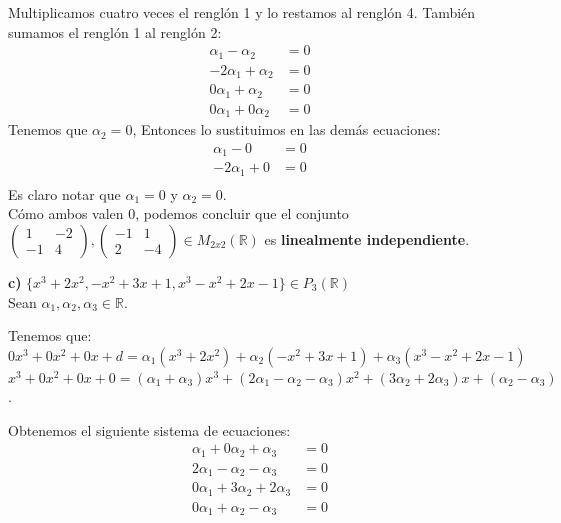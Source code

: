 \documentclass[letterpaper]{article}
\renewcommand{\*}{\cdot}
\theoremstyle{definition}
\begin{document}
Multiplicamos cuatro veces el renglón 1 y lo restamos al renglón 4. También sumamos el renglón 1 al renglón 2:
	\begin{align*}
	\alpha_{1}-\alpha_{2} &= 0\\
	-2\alpha_{1} + \alpha_{2} &= 0\\
	0\alpha_{1}+\alpha_{2}&= 0\\
	0\alpha_{1}+0\alpha_{2}&= 0
	\end{align*}
Tenemos que $\alpha_{2}= 0$, Entonces lo sustituimos en las demás ecuaciones:
	\begin{align*}
	\alpha_{1}-0 &= 0\\
	-2\alpha_{1} + 0 &= 0\\
	\end{align*}
Es claro notar que $\alpha_{1}=0$ y $\alpha_{2}=0$.\\ Cómo ambos valen 0, podemos concluir que el conjunto $\begin{pmatrix} 1 & -2 \\ -1 & 4 \end{pmatrix} ,\begin{pmatrix} -1 & 1 \\ 2 & -4 \end{pmatrix}\in M_{2x2}(\mathbb{R})$ es \textbf{linealmente independiente}.

\textbf{c)} $\lbrace x^{3} + 2x^{2}, -x^{2} + 3x + 1, x^{3} - x^{2} + 2x -1 \rbrace \in P_{3}(\mathbb{R})$ \\

Sean $\alpha_{1}, \alpha_{2}, \alpha_{3}\in \mathbb{R}$.

Tenemos que: $0x^{3}+0x^{2}+0x+d = \alpha_{1}(x^{3}+2x^{2})+ \alpha_{2}(-x^{2}+3x+1)+ \alpha_{3}(x^{3}-x^{2}+2x-1)$ \\  
        
 $x^{3}+0x^{2}+0x+0=(\alpha_{1}+\alpha_{3})x^{3}+(2\alpha_{1}-\alpha_{2}-\alpha_{3})x^{2}+(3\alpha_{2}+2\alpha_{3})x+(\alpha_{2}-\alpha_{3})$.
 
 Obtenemos el siguiente sistema de ecuaciones:
 	\begin{align*}
 	\alpha_{1}+0\alpha_{2}+\alpha_{3}&=0\\
 	2\alpha_{1}-\alpha_{2}-\alpha_{3}&=0\\
 	0\alpha_{1}+3\alpha_{2}+2\alpha_{3}&=0\\
 	0\alpha_{1}+\alpha_{2}-\alpha_{3}&=0
 	\end{align*}
\end{document}
